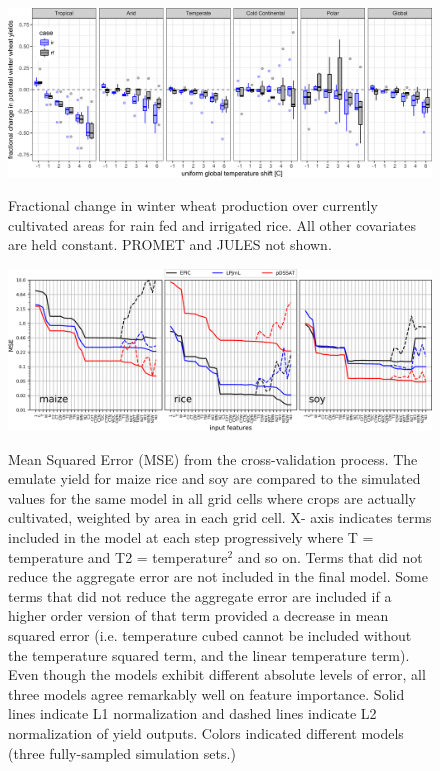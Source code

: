 \documentclass[10pt]{article}
\begin{document}
\begin{figure}[h!]
\includegraphics[width=\textwidth]{s_winter_wheat_sim_CG_area_weight.png}\\
\caption{Fractional change in winter wheat production over currently cultivated areas for rain fed and irrigated rice. All other covariates are held constant. PROMET and JULES not shown.}
\label{fig:winter_wheat_currentcult}
\end{figure}


\begin{figure}[h!]
\includegraphics[width=\textwidth]{s_feature_selection.png}\\
\caption{Mean Squared Error (MSE) from the cross-validation process. The emulate yield for maize rice and soy are compared to the simulated values for the same model in all grid cells where crops are actually cultivated, weighted by area in each grid cell. X- axis indicates terms included in the model at each step progressively where T = temperature and T2 = temperature$^{2}$ and so on. Terms that did not reduce the aggregate error are not included in the final model. Some terms that did not reduce the aggregate error are included if a higher order version of that term provided a decrease in mean squared error (i.e. temperature cubed cannot be included without the temperature squared term, and the linear temperature term). Even though the models exhibit different absolute levels of error, all three models agree remarkably well on feature importance. Solid lines indicate L1 normalization and dashed lines indicate L2 normalization of yield outputs. Colors indicated different models (three fully-sampled simulation sets.)}
\label{fig:featureselection}
\end{figure}
\end{document}
